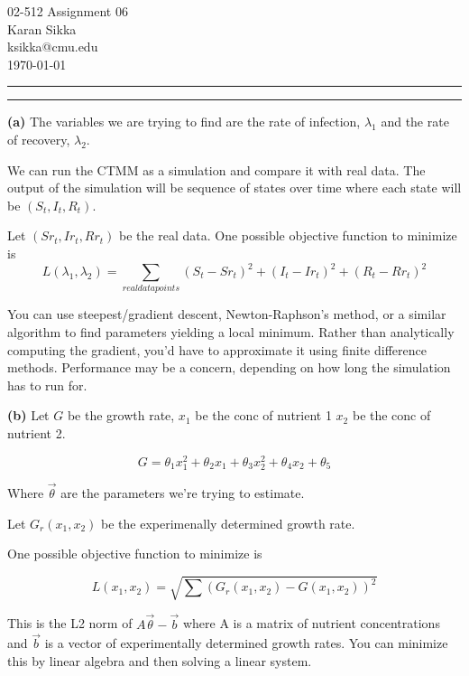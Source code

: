 \documentclass[11pt,letterpaper]{article}
\makeatletter
\newcommand{\question}[1] {\vspace{.25in} \hrule\vspace{0.5em}
\noindent{\bf #1} \vspace{0.5em}
\hrule \vspace{.10in}}
\renewcommand{\part}[1] {\vspace{.10in} {\bf (#1)}}
\newcommand{\myname}{Karan Sikka}
\newcommand{\myandrew}{ksikka@cmu.edu}
\newcommand{\myhwnum}{06}
\makeatother
\begin{document}
\medskip

\thispagestyle{plain}
\begin{center}                  %
{\Large 02-512 Assignment \myhwnum} \\
\myname \\
\myandrew \\
\today
\end{center}

\question{1}
\part{a}
The variables we are trying to find are 
the rate of infection, $\lambda_1$
and the rate of recovery, $\lambda_2$.

We can run the CTMM as a simulation
and compare it with real data.
The output of the simulation will be sequence of states over time
where each state will be $(S_t,I_t,R_t)$.

Let $(Sr_t, Ir_t, Rr_t)$ be the real data.
One possible objective function to minimize is 
$$ L(\lambda_1, \lambda_2) = \sum_{real data points} (S_t - Sr_t)^2 + (I_t - Ir_t)^2 + (R_t - Rr_t)^2 $$

You can use steepest/gradient descent, Newton-Raphson's method, or a similar algorithm to find parameters yielding a local minimum.
Rather than analytically computing the gradient, you'd have to approximate it using finite difference methods.
Performance may be a concern, depending on how long the simulation has to run for.

\part{b}
Let $G$ be the growth rate,
$x_1$ be the conc of nutrient 1
$x_2$ be the conc of nutrient 2.

$$G = \theta_1 x_1^2 + \theta_2 x_1 + \theta_3 x_2^2 + \theta_4 x_2 + \theta_5$$

Where $\vec{\theta}$ are the parameters we're trying to estimate.

Let $G_r(x_1,x_2)$ be the experimenally determined growth rate.

One possible objective function to minimize is

$$L(x_1, x_2) = \sqrt{ \sum (G_r(x_1, x_2) - G(x_1, x_2))^2 }$$

This is the L2 norm of $A\vec{\theta} - \vec{b}$ where A is a matrix of nutrient concentrations and $\vec{b}$ is a vector of experimentally determined growth rates.
You can minimize this by linear algebra and then solving a linear system.
\end{document}
